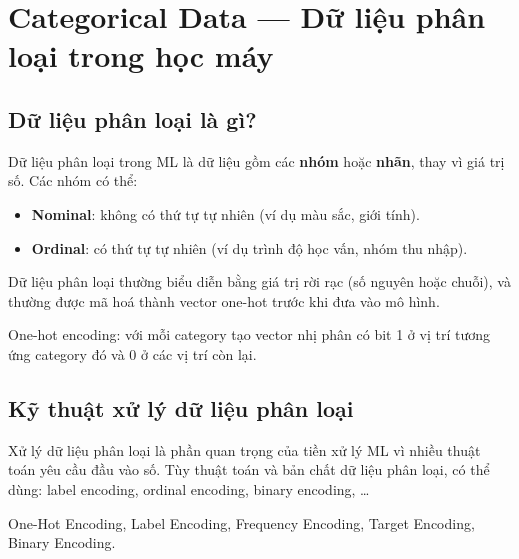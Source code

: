 \section{Categorical Data --- Dữ liệu phân loại trong học máy}

\subsection{Dữ liệu phân loại là gì?}

\begin{dinhnghia}[title={Categorical data}]
Dữ liệu phân loại trong ML là dữ liệu gồm các \textbf{nhóm} hoặc \textbf{nhãn}, thay vì giá trị số.
Các nhóm có thể:
\begin{itemize}
  \item \textbf{Nominal}: không có thứ tự tự nhiên (ví dụ màu sắc, giới tính).
  \item \textbf{Ordinal}: có thứ tự tự nhiên (ví dụ trình độ học vấn, nhóm thu nhập).
\end{itemize}
\end{dinhnghia}

\begin{ynghia}[title={Biểu diễn và one-hot}]
Dữ liệu phân loại thường biểu diễn bằng giá trị rời rạc (số nguyên hoặc chuỗi), và thường được mã hoá thành vector one-hot trước khi đưa vào mô hình.

One-hot encoding: với mỗi category tạo vector nhị phân có bit 1 ở vị trí tương ứng category đó và 0 ở các vị trí còn lại.
\end{ynghia}

\subsection{Kỹ thuật xử lý dữ liệu phân loại}

\begin{dongco}[title={Tiền xử lý bắt buộc với nhiều thuật toán}]
Xử lý dữ liệu phân loại là phần quan trọng của tiền xử lý ML vì nhiều thuật toán yêu cầu đầu vào số.
Tùy thuật toán và bản chất dữ liệu phân loại, có thể dùng: label encoding, ordinal encoding, binary encoding, \ldots
\end{dongco}

\begin{phuongphap}[title={Các kỹ thuật trong bài}]
One-Hot Encoding, Label Encoding, Frequency Encoding, Target Encoding, Binary Encoding.
\end{phuongphap}


